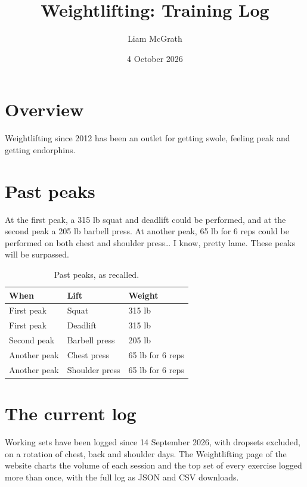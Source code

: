 \documentclass[11pt]{article}
\title{Weightlifting: Training Log}
\author{Liam McGrath}
\date{4 October 2026}
\begin{document}
\maketitle

\section{Overview}
Weightlifting since 2012 has been an outlet for getting swole, feeling peak and getting endorphins.

\section{Past peaks}
At the first peak, a 315 lb squat and deadlift could be performed, and at the second peak a 205 lb barbell press. At another peak, 65 lb for 6 reps could be performed on both chest and shoulder press\ldots{} I know, pretty lame. These peaks will be surpassed.

\begin{table}[htbp]
\centering
\begin{tabular}{lll}
\hline
When & Lift & Weight \\
\hline
First peak & Squat & 315 lb \\
First peak & Deadlift & 315 lb \\
Second peak & Barbell press & 205 lb \\
Another peak & Chest press & 65 lb for 6 reps \\
Another peak & Shoulder press & 65 lb for 6 reps \\
\hline
\end{tabular}
\caption{Past peaks, as recalled.}
\end{table}

\section{The current log}
Working sets have been logged since 14 September 2026, with dropsets excluded, on a rotation of chest, back and shoulder days. The Weightlifting page of the website charts the volume of each session and the top set of every exercise logged more than once, with the full log as JSON and CSV downloads.
\end{document}
